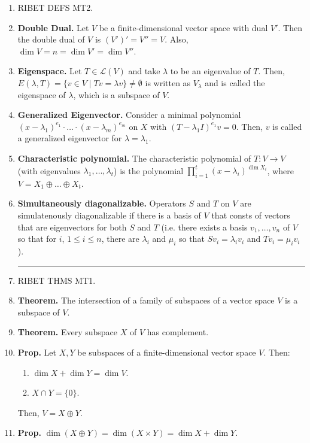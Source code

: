 \begin{enumerate}
	\item RIBET DEFS MT2.
	\item \textbf{Double Dual. } Let $V$ be a finite-dimensional vector space with dual $V'$. Then the double dual of $V$ is $(V')' = V'' = V$. Also, $\dim V = n = \dim V' = \dim V''$. 
	\item \textbf{Eigenspace. } Let $T \in \mathscr{L}(V)$ and take $\lambda$ to be an eigenvalue of $T$. Then, $E(\lambda,T) = \{v \in V \mid Tv = \lambda v\} \neq \emptyset$ is written as $V_\lambda$ and is called the eigenspace of $\lambda$, which is a subspace of $V$. 
	\item \textbf{Generalized Eigenvector. } Consider a minimal polynomial $(x-\lambda_1)^{e_1} \cdot \dots \cdot (x-\lambda_m)^{e_m}$ on $X$ with $(T-\lambda_1I)^{e_1}v = 0$. Then, $v$ is called a generalized eigenvector for $\lambda = \lambda_1$. 
	\item \textbf{Characteristic polynomial. } The characteristic polynomial of $T: V \to V$ (with eigenvalues $\lambda_1,\dots,\lambda_t$) is the polynomial $\prod_{i=1}^{t} (x-\lambda_i)^{\dim X_i}$, where $V = X_1 \oplus \dots \oplus X_t$. 
	\item \textbf{Simultaneously diagonalizable. } Operators $S$ and $T$ on $V$ are simulatenously diagonalizable if there is a basis of $V$ that consts of vectors that are eigenvectors for both $S$ and $T$ (i.e. there exists a basis $v_1,\dots,v_n$ of $V$ so that for $i$, $1 \leq i \leq n$, there are $\lambda_i$ and $\mu_i$ so that $Sv_i = \lambda_iv_i$ and $Tv_i = \mu_iv_i$). 
	\begin{center}
		\hrule
	\end{center} 
	\item RIBET THMS MT1. 
    \item \textbf{Theorem. } The intersection of a family of subspaces of a vector space $V$ is a subspace of $V$. 
    \item \textbf{Theorem. } Every subspace $X$ of $V$ has complement. 
	\item \textbf{Prop. } Let $X,Y$ be subspaces of a finite-dimensional vector space $V$. Then: 
	\begin{enumerate}
		\item $\dim X + \dim Y = \dim V$. 
		\item $X \cap Y = \{0\}$. 
	\end{enumerate}
	Then, $V=X \oplus Y$. 
	\item \textbf{Prop. } $\dim(X \oplus Y) = \dim(X \times Y) = \dim X + \dim Y$. 
	\begin{center}

\end{center}
\end{enumerate}
